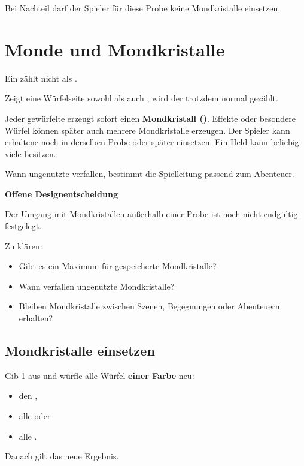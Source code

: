 Bei Nachteil darf der Spieler für diese Probe keine Mondkristalle einsetzen.

\section{Monde und Mondkristalle}

\begin{kurzregel}[title=Monde]
Ein \moon{} zählt nicht als \star.

Zeigt eine Würfelseite sowohl \moon{} als auch \star, wird der \star{} trotzdem normal gezählt.
\end{kurzregel}

Jeder gewürfelte \moon{} erzeugt sofort einen \textbf{Mondkristall (\crystal)}. Effekte oder besondere Würfel können später auch mehrere Mondkristalle erzeugen. Der Spieler kann erhaltene \crystal{} noch in derselben Probe oder später einsetzen. Ein Held kann beliebig viele \crystal{} besitzen.

Wann ungenutzte \crystal{} verfallen, bestimmt die Spielleitung passend zum Abenteuer.

\begin{todo}[title={TODO \#1 -- Regeldesign: Mondkristalle außerhalb einer Probe}]
\textbf{Offene Designentscheidung}

Der Umgang mit Mondkristallen außerhalb einer Probe ist noch nicht endgültig festgelegt.

Zu klären:
\begin{itemize}
  \item Gibt es ein Maximum für gespeicherte Mondkristalle?
  \item Wann verfallen ungenutzte Mondkristalle?
  \item Bleiben Mondkristalle zwischen Szenen, Begegnungen oder Abenteuern erhalten?
\end{itemize}
\end{todo}

\subsection{Mondkristalle einsetzen}

\begin{kurzregel}[title=Mondkristall einsetzen]
Gib 1\crystal{} aus und würfle alle Würfel \textbf{einer Farbe} neu:
\begin{itemize}
  \item den \heroDie,
  \item alle \greenDie{} oder
  \item alle \blueDie.
\end{itemize}
Danach gilt das neue Ergebnis.
\end{kurzregel}

